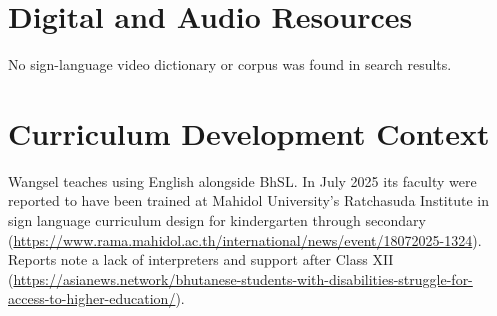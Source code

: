 \documentclass[12pt]{article}
\begin{document}
\section{Digital and Audio Resources}
No sign-language video dictionary or corpus was found in search results.

\section{Curriculum Development Context}
Wangsel teaches using English alongside BhSL. In July 2025 its faculty were reported to have been trained at Mahidol University's Ratchasuda Institute in sign language curriculum design for kindergarten through secondary (\url{https://www.rama.mahidol.ac.th/international/news/event/18072025-1324}). Reports note a lack of interpreters and support after Class XII (\url{https://asianews.network/bhutanese-students-with-disabilities-struggle-for-access-to-higher-education/}).
\end{document}
